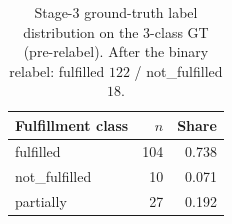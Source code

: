 \begin{table}[htbp]
  \centering
  \caption{Stage-3 ground-truth label distribution on the 3-class GT (pre-relabel). After the binary relabel: fulfilled $122$ / not\_fulfilled $18$.}
  \label{tab:gt-dist-fulfillment}
  \begin{tabular}{lrr}
    \toprule
    Fulfillment class & $n$ & Share \\
    \midrule
    fulfilled & 104 & 0.738 \\
    not\_fulfilled & 10 & 0.071 \\
    partially & 27 & 0.192 \\
    \bottomrule
  \end{tabular}
\end{table}
